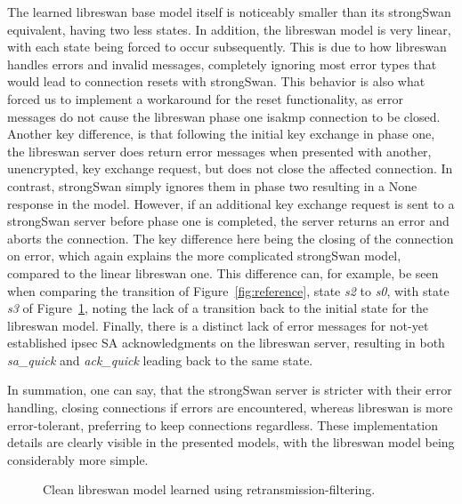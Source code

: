 The learned libreswan base model itself is noticeably smaller than its strongSwan equivalent, having two less states. In addition, the libreswan model is very linear, with each state being forced to occur subsequently. This is due to how libreswan handles errors and invalid messages, completely ignoring most error types that would lead to connection resets with strongSwan. This behavior is also what forced us to implement a workaround for the reset functionality, as error messages do not cause the libreswan phase one \ac{isakmp} connection to be closed. Another key difference, is that following the initial key exchange in phase one, the libreswan server does return error messages when presented with another, unencrypted, key exchange request, but does not close the affected connection. In contrast, strongSwan simply ignores them in phase two resulting in a None response in the model. However, if an additional key exchange request is sent to a strongSwan server before phase one is completed, the server returns an error and aborts the connection. The key difference here being the closing of the connection on error, which again explains the more complicated strongSwan model, compared to the linear libreswan one. This difference can, for example, be seen when comparing the transition of Figure~\ref{fig:reference}, state \emph{s2} to \emph{s0}, with state \emph{s3} of Figure~\ref{fig:learnedmodellibresimple}, noting the lack of a transition back to the initial state for the libreswan model. Finally, there is a distinct lack of error messages for not-yet established \ac{ipsec} SA acknowledgments on the libreswan server, resulting in both \emph{sa\_quick} and \emph{ack\_quick} leading back to the same state. 

In summation, one can say, that the strongSwan server is stricter with their error handling, closing connections if errors are encountered, whereas libreswan is more error-tolerant, preferring to keep connections regardless. These implementation details are clearly visible in the presented models, with the libreswan model being considerably more simple.

\begin{figure}
	\vspace*{\fill}
	\noindent
	\hspace*{-2\oddsidemargin}%
	\caption{Clean libreswan model learned using retransmission-filtering.}
	\label{fig:learnedmodellibresimple}
	\vspace*{\fill}
\end{figure}

